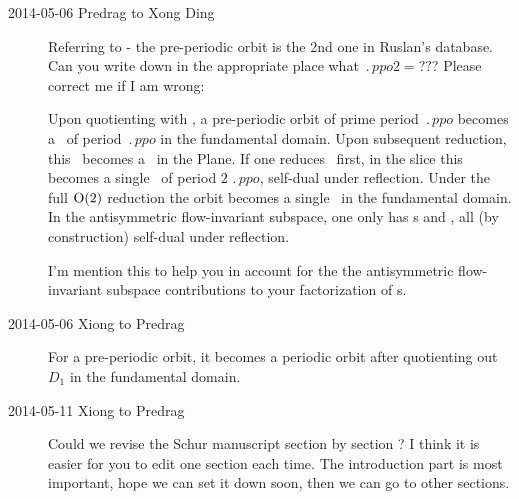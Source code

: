 \begin{description}
\item[2014-05-06 Predrag to Xong Ding]
Referring to
- the pre-periodic orbit  is
the 2nd one in Ruslan's database. Can you write down in the appropriate place
 what $\period{ppo2}
=??$?
Please correct me if I am wrong:

Upon quotienting with , a pre-periodic orbit  of prime period
$\period{ppo}$ becomes a \rpo\ of period $\period{ppo}$ in the 
fundamental domain.
Upon subsequent
 reduction,
this \rpo\ becomes a \po\ in the \slice Plane. If one reduces
\ first, in the slice this becomes a single \po\ of period
$2\,\period{ppo}$, self-dual under  reflection. Under the full
$\textrm{O}(2)$ reduction the orbit becomes a single \po\ in
the fundamental domain. In the antisymmetric
flow-invariant subspace, one only has \po s and \eqva, all (by
construction) self-dual under  reflection.

I'm mention this to help you in account for the the antisymmetric
flow-invariant subspace contributions to your  factorization of
{\Fd s}.

\item[2014-05-06 Xiong to Predrag]
For a pre-periodic orbit, it becomes a periodic orbit after quotienting
out $D_1$ in the fundamental domain.

\item[2014-05-11 Xiong to Predrag]
Could we revise the Schur manuscript section by section ? I think it is
easier for you to edit one section each time. The introduction part is
most important, hope we can set it down soon, then we can go to other
sections.


\end{description}
